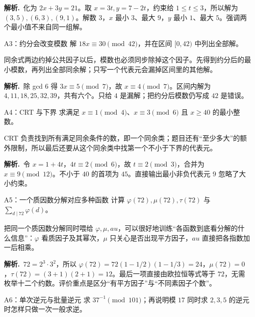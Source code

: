 \documentclass[UTF8,a4paper,11pt,twoside,openright,fontset=fandol]{ctexbook}
\theoremstyle{definition}
\newcommand{\sol}{\par\noindent\textbf{解析.}\ }
\begin{document}
\sol 化为 $2x+3y=21$。取 $x=3t,y=7-2t$，约束给 $1\le t\le3$，所以解为 $(3,5),(6,3),(9,1)$。解数 $3$，$x$ 最小 $3$、最大 $9$，$y$ 最小 $1$、最大 $5$。强调两个最小值不来自同一组解。


\begin{problem}{A3：约分会改变模数}
解 $18x\equiv30\pmod{42}$，并在区间 $[0,42)$ 中列出全部解。
\end{problem}

\begin{pitfall}[讲解：先看这题到底在做什么]
同余式两边约掉公共因子以后，模数也必须同步除掉这个因子。先得到约分后的最小模数，再列出全部同余解；只写一个代表元会漏掉区间里的其他解。
\end{pitfall}

\sol 除 gcd $6$ 得 $3x\equiv5\pmod7$，故 $x\equiv4\pmod7$。区间内解为 $4,11,18,25,32,39$，共有六个。只给 $4$ 是漏解；把约分后模数仍写成 $42$ 是错误。


\begin{problem}{A4：CRT 与下界}
求满足 $x\equiv1\pmod4$、$x\equiv3\pmod6$ 且 $x\ge40$ 的最小整数。
\end{problem}

\begin{pitfall}[讲解：先看这题到底在做什么]
CRT 负责找到所有满足同余条件的数，即一个同余类；题目还有“至少多大”的额外限制，所以最后还要从这个同余类中找第一个不小于下界的代表元。
\end{pitfall}

\sol 令 $x=1+4t$，$4t\equiv2\pmod6$，故 $t\equiv2\pmod3$，合并为 $x\equiv9\pmod{12}$。不小于 $40$ 的首项为 $45$。直接输出最小非负代表元 $9$ 忽略了大小约束。


\begin{problem}{A5：一个质因数分解对应多种函数}
计算 $\varphi(72),\mu(72),\tau(72)$ 与 $\sum_{d\mid72}\varphi(d)$。
\end{problem}

\begin{pitfall}[讲解：先看这题到底在做什么]
把同一个质因数分解同时喂给 $\varphi,\mu,	au$，可以很好地训练“各函数到底看分解的什么信息”：$\varphi$ 看质因子及其幂次，$\mu$ 只关心是否出现平方因子，$	au$ 直接把各指数加一后相乘。
\end{pitfall}

\sol $72=2^3\cdot3^2$，所以 $\varphi(72)=72(1-1/2)(1-1/3)=24$，$\mu(72)=0$，$\tau(72)=(3+1)(2+1)=12$。最后一项直接由欧拉恒等式等于 $72$，无需枚举十二个约数。评价重点是区分“有平方因子”与“不同素因子个数”。


\begin{problem}{A6：单次逆元与批量逆元}
求 $37^{-1}\pmod{101}$；再说明模 $17$ 同时求 $2,3,5$ 的逆元时怎样只做一次一般求逆。
\end{problem}
\end{document}
